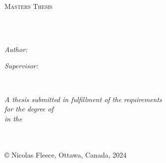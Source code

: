 \documentclass[
11pt, %
oneside, %
english, %
doublespacing, %
nolistspacing, %
headsepline, %
]{MastersDoctoralThesis} %
\author{Nicolas \textsc{Fleece}} %
\begin{document}
\frontmatter %

\pagestyle{plain} %


\begin{titlepage}
\begin{center}

\vspace*{.06\textheight}
{\scshape\LARGE \univname\par}\vspace{1.5cm} %
\textsc{\Large Masters Thesis}\\[0.5cm] %

\HRule \\[0.4cm] %
{\huge \bfseries \ttitle\par}\vspace{0.4cm} %
\HRule \\[1.5cm] %
 
\begin{minipage}[t]{0.4\textwidth}
\begin{flushleft} \large
\emph{Author:}\\
\href{http://www.johnsmith.com}{\authorname} %
\end{flushleft}
\end{minipage}
\begin{minipage}[t]{0.4\textwidth}
\begin{flushright} \large
\emph{Supervisor:} \\
\href{http://www.jamessmith.com}{\supname} %
\end{flushright}
\end{minipage}\\[3cm]
 
\vfill

\large \textit{A thesis submitted in fulfillment of the requirements\\ for the degree of \degreename}\\[0.3cm] %
\textit{in the}\\[0.4cm]
\groupname\\\deptname\\[2cm] %
 
\vfill

{\large © Nicolas Fleece, Ottawa, Canada, 2024}\\[4cm] %
 
\vfill
\end{center}
\end{titlepage}
\end{document}
